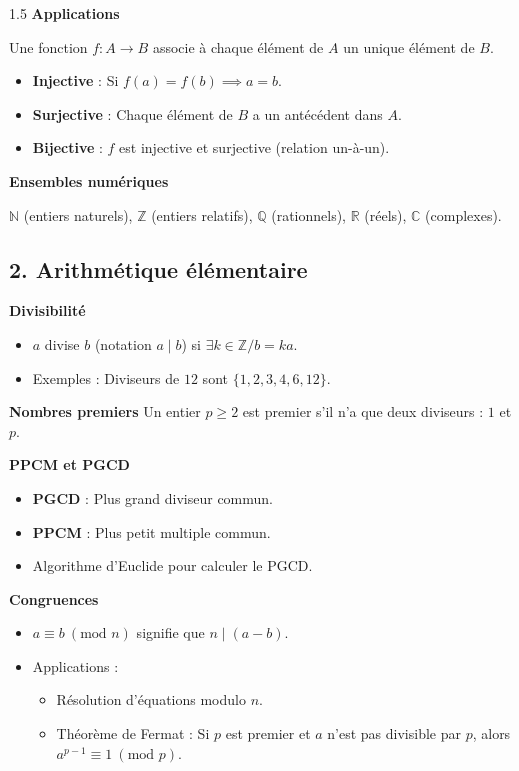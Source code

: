 \documentclass[12pt]{article}
\begin{document}
\begin{spacing}{1.5}
\textbf{Applications}

Une fonction $f: A \to B$ associe à chaque élément de $A$ un unique élément de $B$.
\begin{itemize}
    \item \textbf{Injective} : Si $f(a) = f(b) \implies a = b$.
    \item \textbf{Surjective} : Chaque élément de $B$ a un antécédent dans $A$.
    \item \textbf{Bijective} : $f$ est injective et surjective (relation un-à-un).
\end{itemize}

\textbf{Ensembles numériques}

$\mathbb{N}$ (entiers naturels), $\mathbb{Z}$ (entiers relatifs), $\mathbb{Q}$ (rationnels), $\mathbb{R}$ (réels), $\mathbb{C}$ (complexes).

\subsection*{2. Arithmétique élémentaire}

\textbf{Divisibilité}

\begin{itemize}
    \item $a$ divise $b$ (notation $a \mid b$) si $\exists k\in \mathbb{Z} / b = ka$.
    \item Exemples : Diviseurs de $12$ sont $\{1, 2, 3, 4, 6, 12\}$.
\end{itemize}

\textbf{Nombres premiers}
Un entier $p \geq 2$ est premier s'il n'a que deux diviseurs : $1$ et $p$.

\textbf{PPCM et PGCD}

\begin{itemize}
    \item \textbf{PGCD} : Plus grand diviseur commun.
    \item \textbf{PPCM} : Plus petit multiple commun.
    \item Algorithme d'Euclide pour calculer le PGCD.
\end{itemize}

\textbf{ Congruences}
\begin{itemize}
    \item $a \equiv b \ (\text{mod } n)$ signifie que $n \mid (a - b)$.
    \item Applications :
    \begin{itemize}
        \item Résolution d'équations modulo $n$.
        \item Théorème de Fermat : Si $p$ est premier et $a$ n'est pas divisible par $p$, alors $a^{p-1} \equiv 1 \ (\text{mod } p)$.
    \end{itemize}
\end{itemize}


\end{spacing}
\end{document}
